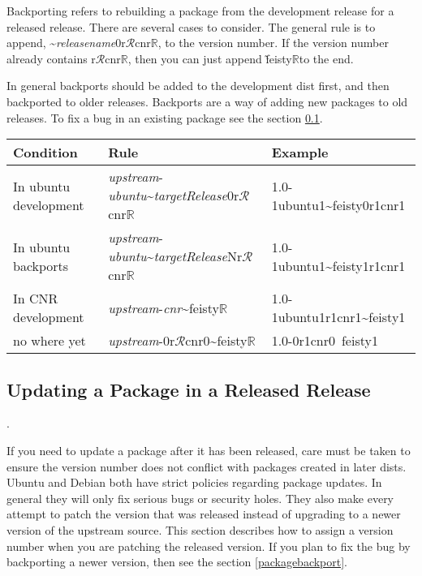 \documentclass[11pt]{article}
\newcommand{\release}{\ensuremath{\mathcal{R}}}
\newcommand{\revision}{\ensuremath{\mathbb{R}}}
\begin{document}
Backporting refers to rebuilding a package from the development
release for a released release. There are several cases to
consider. The general rule is to append,
\~{}\emph{releasename}0r{\release}cnr\revision, to the version
number. If the version number already contains
r{\release}cnr\revision, then you can just append \~feisty\revision to
the end.

In general backports should be added to the development dist first,
and then backported to older releases. Backports are a way of adding
new packages to old releases. To fix a bug in an existing package see the section \ref{packageupdate}.
\noindent
\begin{tabular}{|l|l||l|}
\hline
Condition & Rule & Example \\
\hline
\hline
In ubuntu development & \textit{upstream}-\textit{ubuntu}\~{}\textit{targetRelease}0r{\release}cnr\revision & 1.0-1ubuntu1\~{}feisty0r1cnr1 \\
\hline
In ubuntu backports & \textit{upstream}-\textit{ubuntu}\~{}\textit{targetRelease}Nr{\release}cnr\revision & 1.0-1ubuntu1\~{}feisty1r1cnr1 \\
\hline
In CNR development & \textit{upstream}-\textit{cnr}\~{}feisty\revision & 1.0-1ubuntu1r1cnr1\~{}feisty1 \\
\hline
no where yet &  \textit{upstream}-0r{\release}cnr0\~{}feisty\revision & 1.0-0r1cnr0~feisty1 \\
\hline
\end{tabular}




\subsection{Updating a Package in a Released Release}
\label{packageupdate}.

If you need to update a package after it has been released, care must
be taken to ensure the version number does not conflict with packages
created in later dists. Ubuntu and Debian both have strict policies
regarding package updates. In general they will only fix serious bugs
or security holes. They also make every attempt to patch the version
that was released instead of upgrading to a newer version of the
upstream source. This section describes how to assign a version number
when you are patching the released version. If you plan to fix the bug
by backporting a newer version, then see the section
\ref{packagebackport}.
\end{document}
